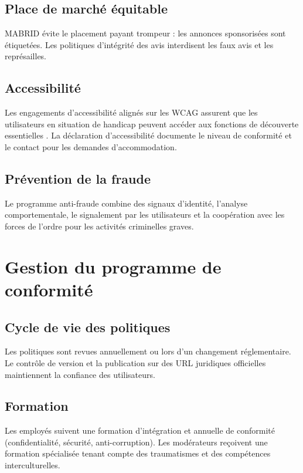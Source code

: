 \subsection{Place de marché équitable}

MABRID évite le placement payant trompeur : les annonces sponsorisées sont étiquetées. Les politiques d'intégrité des avis interdisent les faux avis et les représailles.

\subsection{Accessibilité}

Les engagements d'accessibilité alignés sur les WCAG assurent que les utilisateurs en situation de handicap peuvent accéder aux fonctions de découverte essentielles \parencite{wcag22}. La déclaration d'accessibilité documente le niveau de conformité et le contact pour les demandes d'accommodation.

\subsection{Prévention de la fraude}

Le programme anti-fraude combine des signaux d'identité, l'analyse comportementale, le signalement par les utilisateurs et la coopération avec les forces de l'ordre pour les activités criminelles graves.

\section{Gestion du programme de conformité}

\subsection{Cycle de vie des politiques}

Les politiques sont revues annuellement ou lors d'un changement réglementaire. Le contrôle de version et la publication sur des URL juridiques officielles maintiennent la confiance des utilisateurs.

\subsection{Formation}

Les employés suivent une formation d'intégration et annuelle de conformité (confidentialité, sécurité, anti-corruption). Les modérateurs reçoivent une formation spécialisée tenant compte des traumatismes et des compétences interculturelles.

